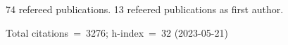 74 refereed publications. 13 refeered publications as first author.

Total citations~=~3276; h-index~=~32 (2023-05-21)